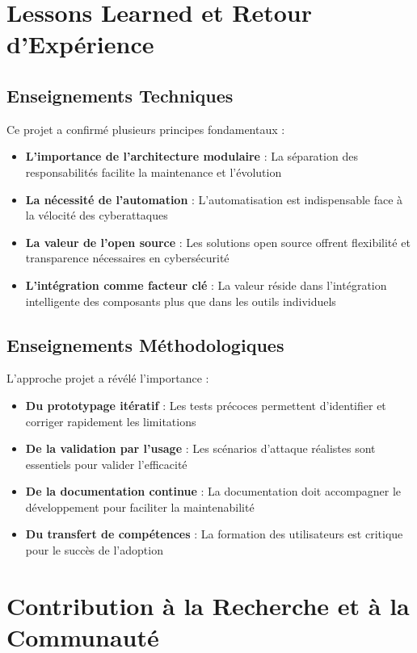 \section{Lessons Learned et Retour d'Expérience}

\subsection{Enseignements Techniques}

Ce projet a confirmé plusieurs principes fondamentaux :

\begin{itemize}
    \item \textbf{L'importance de l'architecture modulaire} : La séparation des responsabilités facilite la maintenance et l'évolution
    \item \textbf{La nécessité de l'automation} : L'automatisation est indispensable face à la vélocité des cyberattaques
    \item \textbf{La valeur de l'open source} : Les solutions open source offrent flexibilité et transparence nécessaires en cybersécurité
    \item \textbf{L'intégration comme facteur clé} : La valeur réside dans l'intégration intelligente des composants plus que dans les outils individuels
\end{itemize}

\subsection{Enseignements Méthodologiques}

L'approche projet a révélé l'importance :

\begin{itemize}
    \item \textbf{Du prototypage itératif} : Les tests précoces permettent d'identifier et corriger rapidement les limitations
    \item \textbf{De la validation par l'usage} : Les scénarios d'attaque réalistes sont essentiels pour valider l'efficacité
    \item \textbf{De la documentation continue} : La documentation doit accompagner le développement pour faciliter la maintenabilité
    \item \textbf{Du transfert de compétences} : La formation des utilisateurs est critique pour le succès de l'adoption
\end{itemize}

\section{Contribution à la Recherche et à la Communauté}

